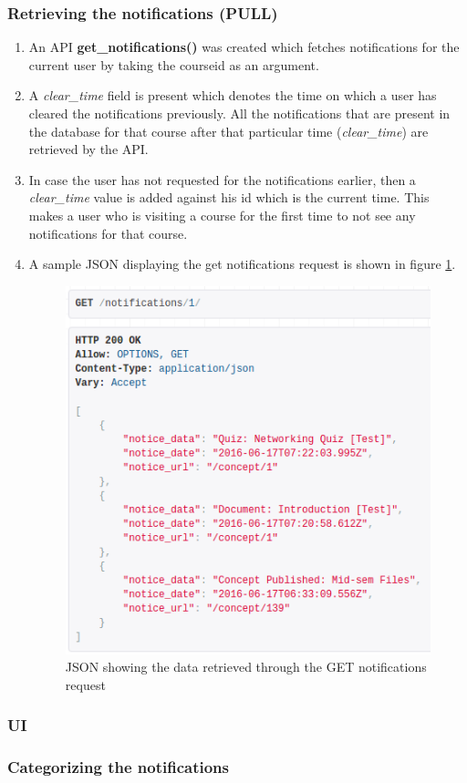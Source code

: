 \subsubsection*{Retrieving the notifications (PULL)}

\begin{enumerate}
	\item An API \textbf{get\_notifications()} was created which fetches notifications for the current user by taking the courseid as an argument.
	\item A \textit{clear\_time} field is present which denotes the time on which a user has cleared the notifications previously. All the notifications that are present in the database for that course after that particular time (\textit{clear\_time}) are retrieved by the API.
	\item In case the user has not requested for the notifications earlier, then a \textit{clear\_time} value is added against his id which is the current time. This makes a user who is visiting a course for the first time to not see any notifications for that course.
	\item A sample JSON displaying the get notifications request is shown in figure \ref{fig:get_notifications}.
	\begin{figure}[h]
		\centering
		\includegraphics[width=0.7\linewidth]{./media/get_notifications}
		\caption{JSON showing the data retrieved through the GET notifications request}
		\label{fig:get_notifications}
	\end{figure}
\end{enumerate}

\subsubsection*{UI}

\subsubsection*{Categorizing the notifications}